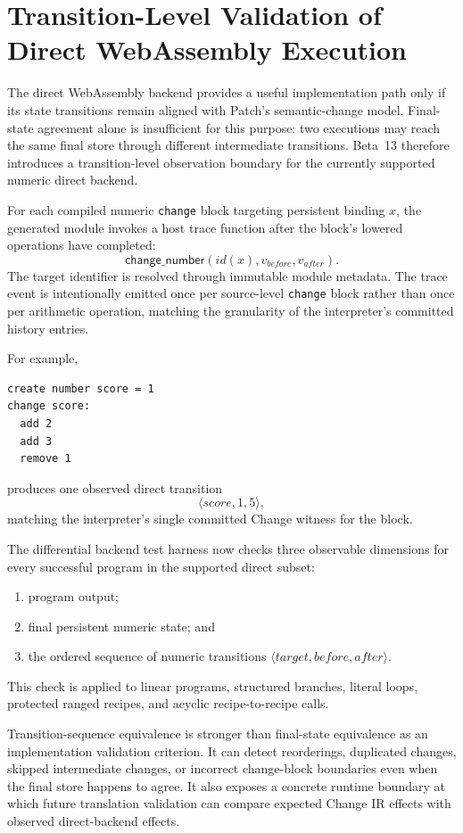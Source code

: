 \section{Transition-Level Validation of Direct WebAssembly Execution}
\label{sec:direct-wasm-trace}

The direct WebAssembly backend provides a useful implementation path only if its state transitions remain aligned with Patch's semantic-change model. Final-state agreement alone is insufficient for this purpose: two executions may reach the same final store through different intermediate transitions. Beta~13 therefore introduces a transition-level observation boundary for the currently supported numeric direct backend.

For each compiled numeric \texttt{change} block targeting persistent binding $x$, the generated module invokes a host trace function after the block's lowered operations have completed:
\[
\mathsf{change\_number}(id(x), v_{before}, v_{after}).
\]
The target identifier is resolved through immutable module metadata. The trace event is intentionally emitted once per source-level \texttt{change} block rather than once per arithmetic operation, matching the granularity of the interpreter's committed history entries.

For example,
\begin{lstlisting}
create number score = 1
change score:
  add 2
  add 3
  remove 1
\end{lstlisting}
produces one observed direct transition
\[
\langle score,1,5\rangle,
\]
matching the interpreter's single committed Change witness for the block.

The differential backend test harness now checks three observable dimensions for every successful program in the supported direct subset:
\begin{enumerate}[leftmargin=*]
\item program output;
\item final persistent numeric state; and
\item the ordered sequence of numeric transitions $\langle target,before,after\rangle$.
\end{enumerate}
This check is applied to linear programs, structured branches, literal loops, protected ranged recipes, and acyclic recipe-to-recipe calls.

Transition-sequence equivalence is stronger than final-state equivalence as an implementation validation criterion. It can detect reorderings, duplicated changes, skipped intermediate changes, or incorrect change-block boundaries even when the final store happens to agree. It also exposes a concrete runtime boundary at which future translation validation can compare expected Change IR effects with observed direct-backend effects.

